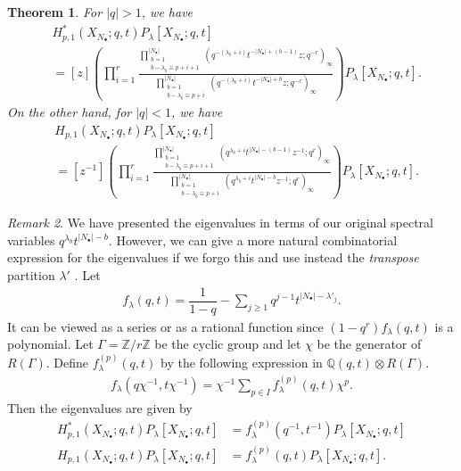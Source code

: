 \documentclass{amsart}
\newcommand{\Z}{\mathbb{Z}}
\newcommand{\Q}{\mathbb{Q}}
\newcommand{\la}{\lambda}
\newtheorem{thm}{Theorem}
\theoremstyle{remark}
\newtheorem{rem}[thm]{Remark}
\numberwithin{thm}{section}
\numberwithin{equation}{section}
\begin{document}
\begin{thm}
For $|q|>1$, we have
\begin{align}
&H^*_{p,1}(X_{N_\bullet};q,t)P_\lambda[X_{N_\bullet};q,t]\\
&= [z]\left( \prod_{i=1}^{r}
\frac{\displaystyle\prod^{|N_\bullet|}_{\substack{b=1\\b-\lambda_b\equiv p+i+1 }}\left(q^{-(\lambda_b+i)}t^{-|N_\bullet|+ (b- 1)}z; q^{- r}\right)_\infty}
{\displaystyle\prod^{|N_\bullet|}_{\substack{b=1\\b-\lambda_b\equiv p+i }}\left(q^{-(\lambda_b+i)}t^{-|N_\bullet| +b}z; q^{- r}\right)_\infty} \right)P_\lambda[X_{N_\bullet};q,t].
\end{align}
On the other hand, for $|q|<1$, we have
\begin{align}
&H_{p,1}(X_{N_\bullet};q,t)P_\lambda[X_{N_\bullet};q,t]\\
&= [z^{-1}]\left( \prod_{i=1}^{r}
\frac{\displaystyle\prod^{|N_\bullet|}_{\substack{b=1\\b-\lambda_b\equiv p+i+1 }}\left(q^{\lambda_b+i}t^{|N_\bullet|- (b- 1)}z^{-1}; q^{ r}\right)_\infty}
{\displaystyle\prod^{|N_\bullet|}_{\substack{b=1\\b-\lambda_b\equiv p+i }}\left(q^{\lambda_b+i}t^{|N_\bullet| -b}z^{-1}; q^{ r}\right)_\infty} \right)P_\lambda[X_{N_\bullet};q,t].   
\end{align}
\end{thm}
\begin{rem} 
We have presented the eigenvalues in terms of our original spectral variables $q^{\lambda_b}t^{|N_\bullet|-b}$.
However, we can give a more natural combinatorial expression for the eigenvalues if we forgo this and use instead the \textit{transpose} partition $\lambda'$ \cite[(I.1.3)]{Mac}.
Let
\begin{align}
f_\lambda(q,t) = \dfrac{1}{1-q} - \sum_{j\ge 1} q^{j-1} t^{|N_\bullet|-\lambda'_j}.
\end{align}
It can be viewed as a series or as a rational function since 
$(1-q^r) f_\lambda(q,t)$ is a polynomial. Let $\Gamma=\Z/r\Z$ be the cyclic group and let $\chi$ be the generator of $R(\Gamma)$. Define $f_\lambda^{(p)}(q,t)$ by the following expression in 
$\Q(q,t) \otimes R(\Gamma)$.
\begin{align}
f_\lambda(q\chi^{-1},t\chi^{-1}) = \chi^{-1}\sum_{p\in I} f^{(p)}_\lambda(q,t) \chi^p.
\end{align}
Then the eigenvalues are given by 
\begin{align}
H^*_{p,1}(X_{N_\bullet};q,t) P_\la[X_{N_\bullet};q,t] &= f_\lambda^{(p)}(q^{-1},t^{-1}) P_\la[X_{N_\bullet};q,t] \\
H_{p,1}(X_{N_\bullet};q,t) P_\la[X_{N_\bullet};q,t] &= f_\lambda^{(p)}(q,t) P_\la[X_{N_\bullet};q,t].
\end{align}
\end{rem}
\end{document}
